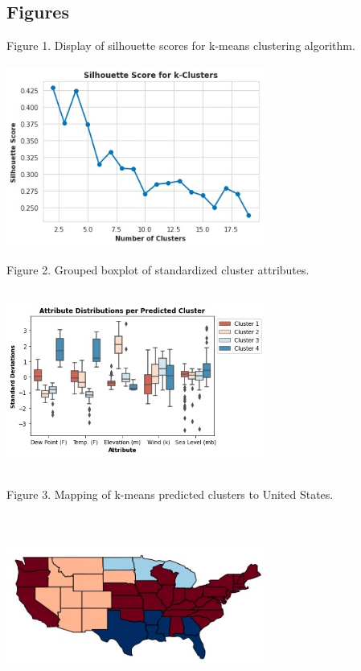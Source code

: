 \documentclass[conference]{IEEEtran}
\begin{document}
\subsection{Figures}

Figure 1. Display of silhouette scores for k-means clustering algorithm.

\includegraphics[width=8.5cm, height=6cm]{silhouette_scores.jpg}

Figure 2. Grouped boxplot of standardized cluster attributes.

\includegraphics[width=8.5cm, height=6cm]{attribute_distribution.jpg}

Figure 3. Mapping of k-means predicted clusters to United States.

\includegraphics[width=8.5cm, height=6cm]{cluster_on_map.jpg}
\end{document}
